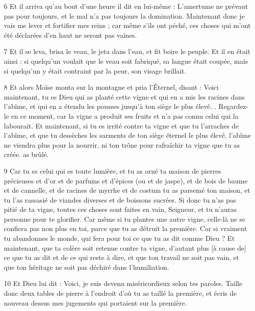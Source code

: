 \par 6 Et il arriva qu'au bout d'une heure il dit en lui-même : L'amertume ne prévaut pas pour toujours, et le mal n'a pas toujours la domination. Maintenant donc je vais me lever et fortifier mes reins ; car même s'ils ont péché, ces choses qui m'ont été déclarées d'en haut ne seront pas vaines.

\par 7 Et il se leva, brisa le veau, le jeta dans l'eau, et fit boire le peuple. Et il en était ainsi : si quelqu'un voulait que le veau soit fabriqué, sa langue était coupée, mais si quelqu'un y était contraint par la peur, son visage brillait.

\par 8 Et alors Moïse monta sur la montagne et pria l'Éternel, disant : Voici maintenant, tu es Dieu qui as planté cette vigne et qui en a mis les racines dans l'abîme, et qui en a étendu les pousses jusqu'à ton siège le plus élevé. . Regardez-le en ce moment, car la vigne a produit ses fruits et n'a pas connu celui qui la labourait. Et maintenant, si tu es irrité contre ta vigne et que tu l'arraches de l'abîme, et que tu dessèches les sarments de ton siège éternel le plus élevé, l'abîme ne viendra plus pour la nourrir, ni ton trône pour rafraîchir ta vigne que tu as créée. as brûlé.

\par 9 Car tu es celui qui es toute lumière, et tu as orné ta maison de pierres précieuses et d'or et de parfums et d'épices (ou et de jaspe), et de bois de baume et de cannelle, et de racines de myrrhe et de costum tu as parsemé ton maison, et tu l'as rassasié de viandes diverses et de boissons sucrées. Si donc tu n'as pas pitié de ta vigne, toutes ces choses sont faites en vain, Seigneur, et tu n'auras personne pour te glorifier. Car même si tu plantes une autre vigne, celle-là ne se confiera pas non plus en toi, parce que tu as détruit la première. Car si vraiment tu abandonnes le monde, qui fera pour toi ce que tu as dit comme Dieu ? Et maintenant, que ta colère soit retenue contre ta vigne, d'autant plus [à cause de] ce que tu as dit et de ce qui reste à dire, et que ton travail ne soit pas vain, et que ton héritage ne soit pas déchiré dans l'humiliation.

\par 10 Et Dieu lui dit : Voici, je suis devenu miséricordieux selon tes paroles. Taille donc deux tables de pierre à l'endroit d'où tu as taillé la première, et écris de nouveau dessus mes jugements qui portaient sur la première.

